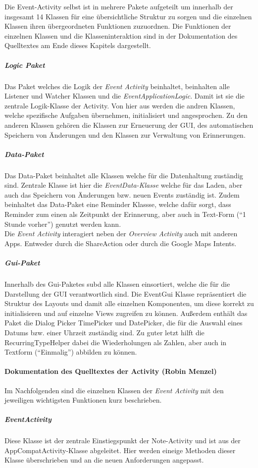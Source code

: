 Die Event-Activity selbst ist in mehrere Pakete aufgeteilt um innerhalb der insgesamt 14 Klassen für eine übersichtliche Struktur zu sorgen und die einzelnen Klassen ihren übergeordneten Funktionen zuzuordnen. Die Funktionen der einzelnen Klassen und die Klasseninteraktion sind in der Dokumentation des Quelltextes am Ende dieses Kapitels dargestellt.

\subparagraph{Logic Paket}
Das Paket welches die Logik der \textit{Event Activity} beinhaltet, beinhalten alle Listener und Watcher Klassen und die \textit{EventApplicationLogic}. Damit ist sie die zentrale Logik-Klasse der Activity. Von hier aus werden die andren Klassen, welche spezifische Aufgaben übernehmen, initialisiert und angesprochen. Zu den anderen Klassen gehören die Klassen zur Erneuerung der GUI, des automatischen Speichern von Änderungen und den Klassen zur Verwaltung von Erinnerungen.

\subparagraph{Data-Paket}
Das Data-Paket beinhaltet alle Klassen welche für die Datenhaltung zuständig sind. Zentrale Klasse ist hier die \textit{EventData-Klasse} welche für das Laden, aber auch das Speichern von Änderungen bzw. neuen Events zuständig ist. Zudem beinhaltet das Data-Paket eine Reminder Klassse, welche dafür sorgt, dass Reminder zum einen als Zeitpunkt der Erinnerung, aber auch in Text-Form (``1 Stunde vorher'') genutzt werden kann. \\
Die \textit{Event Activity} interagiert neben der \textit{Overview Activity} auch mit anderen Apps. Entweder durch die ShareAction oder durch die Google Maps Intents.

\subparagraph{Gui-Paket}
Innerhalb des Gui-Paketes subd alle Klassen einsortiert, welche die für die Darstellung der GUI verantwortlich sind. Die EventGui Klasse repräsentiert die Struktur des Layouts und damit alle einzelnen Komponenten, um diese korrekt zu initialisieren und auf einzelne Views zugreifen zu können. Außerdem enthält das Paket die Dialog Picker TimePicker und DatePicker, die für die Auswahl eines Datums bzw. einer Uhrzeit zuständig sind. Zu guter letzt hilft die RecurringTypeHelper dabei die Wiederholungen als Zahlen, aber auch in Textform (``Einmalig'') abbilden zu können.

\paragraph{Dokumentation des Quelltextes der Activity (Robin Menzel)}
Im Nachfolgenden sind die einzelnen Klassen der \textit{Event Activity} mit den jeweiligen wichtigsten Funktionen kurz beschrieben.
\subparagraph{EventActivity}
Diese Klasse ist der zentrale Einstiegspunkt der Note-Activity und ist aus der AppCompatActivity-Klasse abgeleitet. Hier werden eineige Methoden dieser Klasse überschrieben und an die neuen Anforderungen angepasst.

